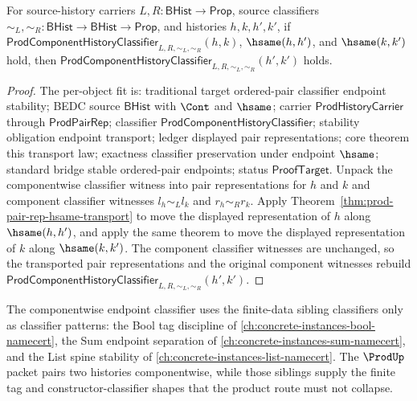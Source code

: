 \begin{theorem}
\label{thm:prod-component-history-classifier-hsame-transport}
For source-history carriers $L,R:\mathsf{BHist}\to\mathsf{Prop}$, source
classifiers $\sim_L,\sim_R:\mathsf{BHist}\to\mathsf{BHist}\to\mathsf{Prop}$,
and histories $h,k,h',k'$, if
$\mathsf{ProdComponentHistoryClassifier}_{L,R,\sim_L,\sim_R}(h,k)$,
$\hsame(h,h')$, and $\hsame(k,k')$ hold, then
$\mathsf{ProdComponentHistoryClassifier}_{L,R,\sim_L,\sim_R}(h',k')$ holds.
\end{theorem}
\begin{proof}
The per-object fit is: traditional target ordered-pair classifier endpoint
stability; BEDC source $\mathsf{BHist}$ with $\Cont$ and $\hsame$; carrier
$\mathsf{ProdHistoryCarrier}$ through $\mathsf{ProdPairRep}$; classifier
$\mathsf{ProdComponentHistoryClassifier}$; stability obligation endpoint
transport; ledger displayed pair representations; core theorem this transport
law; exactness classifier preservation under endpoint $\hsame$; standard bridge
stable ordered-pair endpoints; status $\mathsf{ProofTarget}$. Unpack the
componentwise classifier witness into pair representations for $h$ and $k$ and
component classifier witnesses $l_h\sim_L l_k$ and $r_h\sim_R r_k$. Apply
Theorem~\ref{thm:prod-pair-rep-hsame-transport} to move the displayed
representation of $h$ along $\hsame(h,h')$, and apply the same theorem to move
the displayed representation of $k$ along $\hsame(k,k')$. The component
classifier witnesses are unchanged, so the transported pair representations
and the original component witnesses rebuild
$\mathsf{ProdComponentHistoryClassifier}_{L,R,\sim_L,\sim_R}(h',k')$.
\end{proof}

The componentwise endpoint classifier uses the finite-data sibling classifiers
only as classifier patterns: the Bool tag discipline of
\autoref{ch:concrete-instances-bool-namecert}, the Sum endpoint separation of
\autoref{ch:concrete-instances-sum-namecert}, and the List spine stability of
\autoref{ch:concrete-instances-list-namecert}. The $\ProdUp$ packet pairs two
histories componentwise, while those siblings supply the finite tag and
constructor-classifier shapes that the product route must not collapse.

